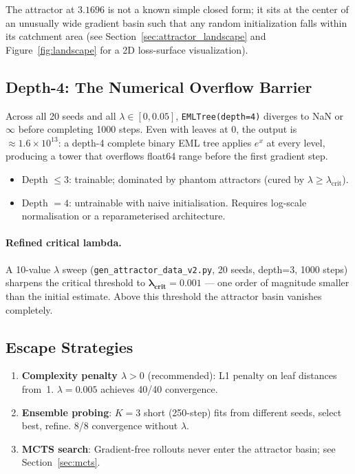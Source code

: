 \documentclass[11pt,a4paper]{article}
\begin{document}
The attractor at $3.1696$ is not a known simple closed form; it sits
at the center of an unusually wide gradient basin such that any random
initialization falls within its catchment area
(see Section~\ref{sec:attractor_landscape} and Figure~\ref{fig:landscape}
for a 2D loss-surface visualization).

\subsection{Depth-4: The Numerical Overflow Barrier}

Across all 20 seeds and all $\lambda\in[0,0.05]$, \texttt{EMLTree(depth=4)}
diverges to NaN or $\infty$ before completing 1000 steps.
Even with leaves at $0$, the output is $\approx 1.6\times10^{13}$:
a depth-4 complete binary EML tree applies $e^x$ at every level,
producing a tower that overflows float64 range before the first gradient step.

\begin{itemize}
  \item Depth $\leq 3$: trainable; dominated by phantom attractors
    (cured by $\lambda\geq\lambda_{\text{crit}}$).
  \item Depth $= 4$: untrainable with naive initialisation.
    Requires log-scale normalisation or a reparameterised architecture.
\end{itemize}

\paragraph{Refined critical lambda.}
A 10-value $\lambda$ sweep (\texttt{gen\_attractor\_data\_v2.py},
20 seeds, depth=3, 1000 steps) sharpens the critical threshold to
$\boldsymbol{\lambda_{\text{crit}}=0.001}$ ---
one order of magnitude smaller than the initial estimate.
Above this threshold the attractor basin vanishes completely.

\subsection{Escape Strategies}

\begin{enumerate}
  \item \textbf{Complexity penalty $\lambda>0$} (recommended):
    L1 penalty on leaf distances from~1.
    $\lambda=0.005$ achieves 40/40 convergence.

  \item \textbf{Ensemble probing}:
    $K=3$ short (250-step) fits from different seeds, select best, refine.
    8/8 convergence without $\lambda$.

  \item \textbf{MCTS search}:
    Gradient-free rollouts never enter the attractor basin;
    see Section~\ref{sec:mcts}.
\end{enumerate}
\end{document}
